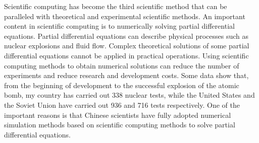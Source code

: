 \documentclass[10pt,journal,compsoc]{IEEEtran}
\begin{document}
% 
% 
% 
% 
Scientific computing has become the third scientific method that can be paralleled with theoretical and experimental scientific methods\cite{ShiZhongci2000}\cite{LuJinfu2004}. An important content in scientific computing is to numerically solving partial differential equations\cite{logan2014}. Partial differential equations can describe physical processes such as nuclear explosions and fluid flow. Complex theoretical solutions of some partial differential equations cannot be applied in practical operations. Using scientific computing methods to obtain numerical solutions can reduce the number of experiments and reduce research and development costs. Some data show that\cite{ShiZhongci2000}, from the beginning of development to the successful explosion of the atomic bomb, my country has carried out 338 nuclear tests, while the United States and the Soviet Union have carried out 936 and 716 tests respectively. One of the important reasons is that Chinese scientists have fully adopted numerical simulation methods based on scientific computing methods to solve partial differential equations.
\end{document}
